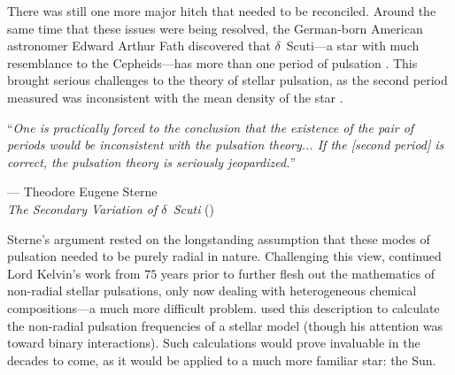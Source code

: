There was still one more major hitch that needed to be reconciled. 
Around the same time that these issues were being resolved, the German-born American astronomer Edward Arthur Fath discovered that $\delta$~Scuti---a star with much resemblance to the Cepheids---has more than one period of pulsation \citep{fath1935photometric}. 
This brought serious challenges to the theory of stellar pulsation, as the second period measured was inconsistent with the mean density of the star \citep{1938ApJ....87..133S,1940PNAS...26..537S}. 
\epigraph{``\emph{One is practically forced to the conclusion that the existence of the pair of periods \hphantom{``}would be inconsistent with the pulsation theory... If the [second period] is correct, \hphantom{``}the pulsation theory is seriously jeopardized.}''}{--- Theodore Eugene Sterne\\\textit{The Secondary Variation of $\delta$~Scuti} (\citeyear{1938ApJ....87..133S})}

Sterne's argument rested on the longstanding assumption that these modes of pulsation needed to be purely radial in nature. 
Challenging this view, \citet{1938ApJ....88..189P} continued Lord Kelvin's work from $75$ years prior to further flesh out the mathematics of non-radial stellar pulsations, only now dealing with heterogeneous chemical compositions---a much more difficult problem. 
\citet{1941MNRAS.101..367C} used this description to calculate the non-radial pulsation frequencies of a stellar model (though his attention was toward binary interactions). %
Such calculations would prove invaluable in the decades to come, as it would be applied to a much more familiar star: the Sun. %



